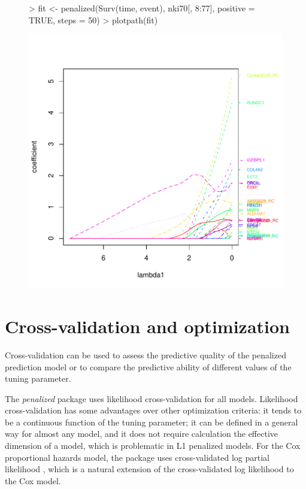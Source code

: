 \documentclass[a4paper]{article}
\newcommand{\Rpackage}[1]{{\textit{#1}}}
\begin{document}
\begin{figure}
\begin{Schunk}
\begin{Sinput}
> fit <- penalized(Surv(time, event), nki70[, 8:77], positive = TRUE, 
      steps = 50)
> plotpath(fit)
\end{Sinput}
\end{Schunk}
\includegraphics{penalized-positivestepsplot}
\end{figure}


\section{Cross-validation and optimization} \label{cv}

Cross-validation can be used to assess the predictive quality of the penalized prediction model or to compare the predictive ability of different values of the tuning parameter.

The \Rpackage{penalized} package uses likelihood cross-validation for all models. Likelihood cross-validation has some advantages over other optimization criteria: it tends to be a continuous function of the tuning parameter; it can be defined in a general way for almost any model, and it does not require calculation the effective dimension of a model, which is problematic in L1 penalized models. For the Cox proportional hazards model, the package uses cross-validated log partial likelihood \citep{Verweij1993}, which is a natural extension of the cross-validated log likelihood to the Cox model.
\end{document}
